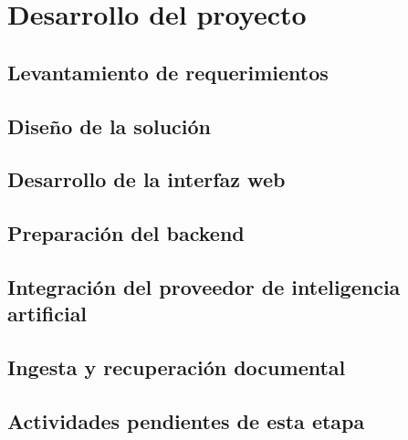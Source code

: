 \section{Desarrollo del proyecto}

\subsection{Levantamiento de requerimientos}

\subsection{Diseño de la solución}

\subsection{Desarrollo de la interfaz web}

\subsection{Preparación del backend}

\subsection{Integración del proveedor de inteligencia artificial}

\subsection{Ingesta y recuperación documental}

\subsection{Actividades pendientes de esta etapa}
